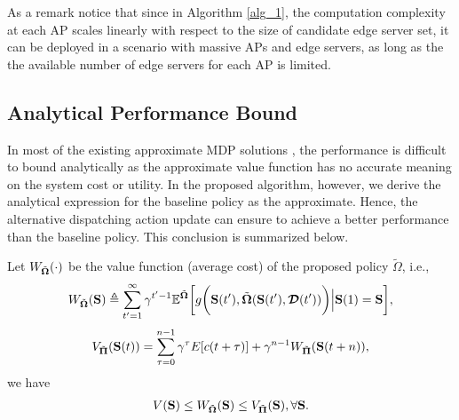 As a remark notice that since in Algorithm \ref{alg_1}, the computation complexity at each AP scales linearly with respect to {the size of candidate edge server set}, it can be deployed in a scenario with massive APs and edge servers, as long as the {the available number of edge servers for each AP} is limited.

\subsection{Analytical Performance Bound}
\label{subsec:analysis}
In most of the existing approximate MDP solutions \cite{mdp-bound1,mdp-bound2,mdp-bound3}, the performance is difficult to bound analytically as the approximate value function has no accurate meaning on the system cost or utility.
In the proposed algorithm, however, we derive the analytical expression for the baseline policy as the approximate.
Hence, the alternative dispatching action update can ensure to achieve a better performance than the baseline policy.
This conclusion is summarized below.
\begin{lemma}
    \label{lemma:bound}
    Let $W_{\tilde{\boldsymbol{\Omega}}}(\cdot)$ be the value function (average cost) of the proposed policy $\tilde{\Omega}$, i.e.,
    {\small
    \begin{align}
        W_{\tilde{\boldsymbol{\Omega}}}(\mathbf{S}) \triangleq
        \sum_{t'=1}^{\infty} \gamma^{t'-1} \mathbb{E}^{ \tilde{\boldsymbol{\Omega}} } \bigg[
            g\bigg(\mathbf{S}(t'), \tilde{\boldsymbol{\Omega}}(\mathbf{S}(t'),\boldsymbol{\mathcal{D}}(t'))\bigg) \Big| \mathbf{S}(1)=\mathbf{S}
        \bigg],
    \end{align}
    }
    {\small
    \begin{align}
        V_{\tilde{\boldsymbol{\Pi}}}(\mathbf{S}(t)) = \sum_{\tau=0}^{n-1} \gamma^{\tau} E[c(t+\tau)] + \gamma^{n-1} W_{\tilde{\boldsymbol{\Pi}}}(\mathbf{S}(t+n)),
    \end{align}
    }%
    we have
    {\small
    \begin{align}
        V(\mathbf{S})
        \leq W_{\tilde{\boldsymbol{\Omega}}}(\mathbf{S})
        \leq V_{\tilde{\boldsymbol{\Pi}}}(\mathbf{S}),
        \forall \mathbf{S}.
    \end{align}
    }%
\end{lemma}
